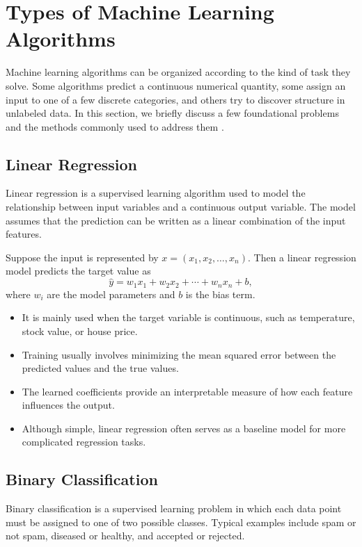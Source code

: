 \documentclass[english,12pt,a4paper]{report}
\begin{document}
	\section{Types of Machine Learning Algorithms}
	\hspace{1.15em}Machine learning algorithms can be organized according to the kind of task they solve. Some algorithms predict a continuous numerical quantity, some assign an input to one of a few discrete categories, and others try to discover structure in unlabeled data. In this section, we briefly discuss a few foundational problems and the methods commonly used to address them \cite{Djordjevic2021}.
	
	\subsection{Linear Regression}
	\hspace{1.15em}Linear regression is a supervised learning algorithm used to model the relationship between input variables and a continuous output variable. The model assumes that the prediction can be written as a linear combination of the input features.
	
	Suppose the input is represented by $x=(x_1,x_2,\dots,x_n)$. Then a linear regression model predicts the target value as
	\begin{equation}
		\hat{y} = w_1x_1 + w_2x_2 + \cdots + w_nx_n + b,
	\end{equation}
	where $w_i$ are the model parameters and $b$ is the bias term.
	
	
	\begin{itemize}
		\item It is mainly used when the target variable is continuous, such as temperature, stock value, or house price.
		\item Training usually involves minimizing the mean squared error between the predicted values and the true values.
		\item The learned coefficients provide an interpretable measure of how each feature influences the output.
		\item Although simple, linear regression often serves as a baseline model for more complicated regression tasks.
	\end{itemize}
	
	\subsection{Binary Classification}
	\hspace{1.15em}Binary classification is a supervised learning problem in which each data point must be assigned to one of two possible classes. Typical examples include spam or not spam, diseased or healthy, and accepted or rejected.
	
\end{document}
